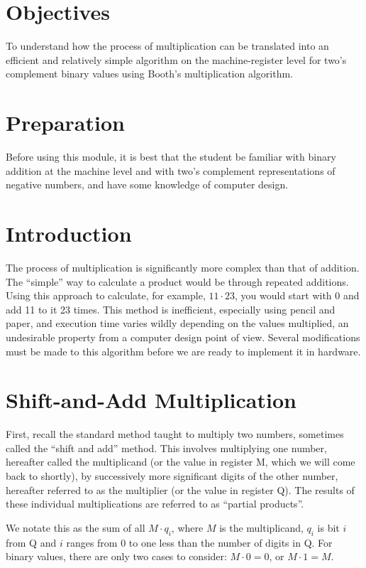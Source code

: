 \documentclass{article}
\begin{document}
\section{Objectives}
To understand how the process of multiplication can be translated into an efficient and relatively simple algorithm on the machine-register level for two's complement binary values using Booth's multiplication algorithm.

\section{Preparation}
Before using this module, it is best that the student be familiar with binary addition at the machine level and with two's complement representations of negative numbers, and have some knowledge of computer design.

\section{Introduction}
The process of multiplication is significantly more complex than that of addition.
The ``simple'' way to calculate a product would be through repeated additions.
Using this approach to calculate, for example, $11 \cdot 23$, you would start with 0 and add 11 to it 23 times.
This method is inefficient, especially using pencil and paper, and execution time varies wildly depending on the values multiplied, an undesirable property from a computer design point of view.
Several modifications must be made to this algorithm before we are ready to implement it in hardware.

\section{Shift-and-Add Multiplication}
First, recall the standard method taught to multiply two numbers, sometimes called the ``shift and add'' method.
This involves multiplying one number, hereafter called the multiplicand (or the value in register M, which we will come back to shortly), by successively more significant digits of the other number, hereafter referred to as the multiplier (or the value in register Q).
The results of these individual multiplications are referred to as ``partial products''.

We notate this as the sum of all $M \cdot q_i$, where $M$ is the multiplicand, $q_i$ is bit $i$ from Q and $i$ ranges from 0 to one less than the number of digits in Q.
For binary values, there are only two cases to consider: $M \cdot 0 = 0$, or $M \cdot 1 = M$.
\end{document}
